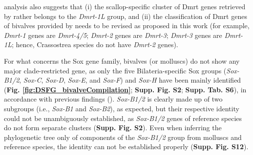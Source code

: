 \documentclass[../main.tex]{subfiles}
\begin{document}
analysis also suggests that (i) the scallop-specific cluster of Dmrt genes retrieved by \textbf{\cite{wang2023genome}} rather belongs to the \textit{Dmrt-1L} group, and (ii) the classification of Dmrt genes of bivalves provided by \textbf{\cite{zeng2024genome}} needs to be revised as proposed in this work (for example, \textit{Dmrt-1} genes are \textit{Dmrt-4/5}; \textit{Dmrt-2} genes are \textit{Dmrt-3}; \textit{Dmrt-3} genes are \textit{Dmrt-1L}; hence, Crassostrea species do not have \textit{Dmrt-2} genes).

For what concerns the Sox gene family, bivalves (or molluscs) do not show any major clade-restricted gene, as only the five Bilateria-specific Sox groups (\textit{Sox-B1/2}, \textit{Sox-C}, \textit{Sox-D}, \textit{Sox-E}, and \textit{Sox-F}) and \textit{Sox-H} have been mainly identified (\textbf{Fig. \ref{fig:DSFG_bivalveCompilation}}; \textbf{Supp. Fig. S2}; \textbf{Supp. Tab. S6}), in accordance with previous findings (\textbf{\cite{yu2017genome,evensen2022comparative,wang2024genome}}). \textit{Sox-B1/2} is clearly made up of two subgroups (i.e., \textit{Sox-B1} and \textit{Sox-B2}), as expected, but their respective identity could not be unambiguously established, as \textit{Sox-B1/2} genes of reference species do not form separate clusters (\textbf{Supp. Fig. S2}). Even when inferring the phylogenetic tree only of components of the \textit{Sox-B1/2} group from molluscs and reference species, the identity can not be established properly (\textbf{Supp. Fig. S12}).
\end{document}
